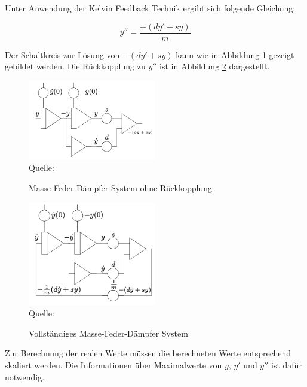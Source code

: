 Unter Anwendung der Kelvin Feedback Technik ergibt sich folgende Gleichung:

\[y''=\frac{-(dy'+sy)}{m}\]

Der Schaltkreis zur Lösung von \(-(dy'+sy)\) kann wie in Abbildung \ref{fig:Feder-Masse-Dämpfer System} gezeigt gebildet werden. Die Rückkopplung zu \(y''\) ist in Abbildung \ref{fig:Feder-Masse-Dämpfer System mit Rückkopplung} dargestellt.

\begin{figure}[h]
  \label{fig:Feder-Masse-Dämpfer System}
  \caption{Masse-Feder-Dämpfer System ohne Rückkopplung}
  \includegraphics[width=0.5\textwidth]{abbildungen/feder_masse_daempfer.png}
  \\
  Quelle: \cite[S. 170]{Ulmann2022}
\end{figure}

\begin{figure}[h]
  \label{fig:Feder-Masse-Dämpfer System mit Rückkopplung}
  \caption{Vollständiges Masse-Feder-Dämpfer System}
  \includegraphics[width=0.5\textwidth]{abbildungen/feder_masse_daempfer_mit_rueckkopplung.png}
  \\
  Quelle: \cite[S. 170]{Ulmann2022}
\end{figure}

Zur Berechnung der realen Werte müssen die berechneten Werte entsprechend skaliert werden. Die Informationen über Maximalwerte von \(y\), \(y'\) und \(y''\) ist dafür notwendig.
